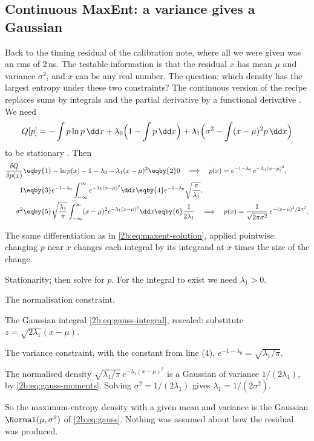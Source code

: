 \subsection{Continuous MaxEnt: a variance gives a Gaussian}
\label{2b:sec:maxent-gauss}

Back to the timing residual of the calibration note, where all we were given was an rms of $2$\,ns. The testable information is that the residual $x$ has mean $\mu$ and variance $\sigma^2$, and $x$ can be any real number. The question: which density has the largest entropy under these two constraints? The continuous version of the recipe replaces sums by integrals and the partial derivative by a functional derivative . We need
\[
  Q[p]=-\int p\ln p\,\dd x+\lambda_0\Bigl(1-\int p\,\dd x\Bigr)+\lambda_1\Bigl(\sigma^2-\int(x-\mu)^2p\,\dd x\Bigr)
\]
to be stationary . Then
\begin{align}
  \frac{\delta Q}{\delta p(x)}
  &\eqby{1} -\ln p(x)-1-\lambda_0-\lambda_1(x-\mu)^2 \eqby{2} 0
  \quad\Longrightarrow\quad p(x)=e^{-1-\lambda_0}\,e^{-\lambda_1(x-\mu)^2} , \nonumber\\
  1&\eqby{3} e^{-1-\lambda_0}\int_{-\infty}^{\infty}e^{-\lambda_1(x-\mu)^2}\dd x
   \eqby{4} e^{-1-\lambda_0}\sqrt{\frac{\pi}{\lambda_1}} , \nonumber\\
  \sigma^2&\eqby{5} \sqrt{\frac{\lambda_1}{\pi}}\int_{-\infty}^{\infty}(x-\mu)^2e^{-\lambda_1(x-\mu)^2}\dd x
   \eqby{6} \frac{1}{2\lambda_1}
  \quad\Longrightarrow\quad
  p(x)=\frac{1}{\sqrt{2\pi\sigma^2}}\,e^{-(x-\mu)^2/2\sigma^2}.
  \label{2b:eq:maxent-gauss}
\end{align}
\begin{explain}
  \item The same differentiation as in \eqref{2b:eq:maxent-solution}, applied pointwise: changing $p$ near $x$ changes each integral by its integrand at $x$ times the size of the change.
  \item Stationarity; then solve for $p$. For the integral to exist we need $\lambda_1>0$.
  \item The normalisation constraint.
  \item The Gaussian integral \eqref{2b:eq:gauss-integral}, rescaled: substitute $z=\sqrt{2\lambda_1}(x-\mu)$.
  \item The variance constraint, with the constant from line (4), $e^{-1-\lambda_0}=\sqrt{\lambda_1/\pi}$.
  \item The normalised density $\sqrt{\lambda_1/\pi}\,e^{-\lambda_1(x-\mu)^2}$ is a Gaussian of variance $1/(2\lambda_1)$, by \eqref{2b:eq:gauss-moments}. Solving $\sigma^2=1/(2\lambda_1)$ gives $\lambda_1=1/(2\sigma^2)$.
\end{explain}
So the maximum-entropy density with a given mean and variance is the Gaussian $\Normal(\mu,\sigma^2)$ of \eqref{2b:eq:gauss}. Nothing was assumed about how the residual was produced.


